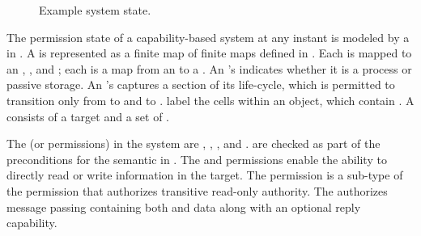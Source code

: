 \begin{figure}
  \caption{Example system state. \label{fig:sketch:exampleState}}
\end{figure}


The permission state of a capability-based system at any instant is modeled by a \term{\TMsystemState} in \TMmodelName{}.
A \TMsystemState{} is represented as a finite map of finite maps defined in .
Each \term{\TMref} is mapped to an \TMobj{}, \TMobjLabel{}, and \TMobjType{}; each \term{\TMobj} is a map from an \TMidx{} to a \TMcap{}.
An \TMobj{}'s  indicates whether it is a process or passive storage.
An \TMobj{}'s  captures a section of its life-cycle, which is permitted to transition only from \NMunborn{} to \NMalive{} and \NMalive{} to \NMdead{}.
\Term{\TMidxs} label the cells within an object, which contain \TMcaps{}.
A \term{\TMcap} consists of a target \TMref{} and a set of \TMaccessRights{}.

The \term{\TMaccessRights} (or permissions) in the system are \NMrd{}, \NMwr{}, \NMwk{}, and \NMtx{}.
\xmakefirstuc{\TMaccessRights} are checked as part of the preconditions for the semantic \TMops{} in .
The \NMrd{} and \NMwr{} permissions enable the ability to directly read or write information in the target.
The \NMwk{} permission is a sub-type of the \NMwk{} permission that authorizes transitive read-only authority.
The \NMtx{} \TMaccessRight{} authorizes message passing containing both \TMcaps{} and data along with an optional reply capability.

